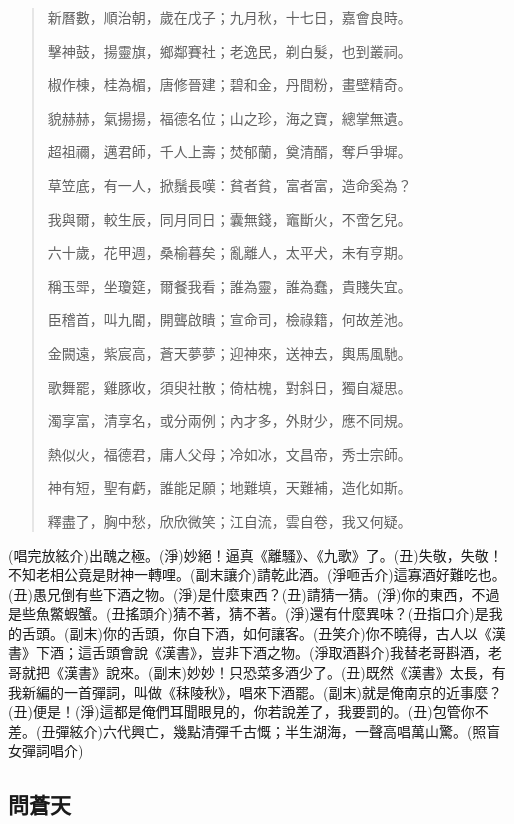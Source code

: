 \documentclass[UTF8]{ctexart}
\begin{document}
\begin{verse}

    新曆數，順治朝，歲在戊子；九月秋，十七日，嘉會良時。
    
    擊神鼓，揚靈旗，鄉鄰賽社；老逸民，剃白髮，也到叢祠。
    
    椒作棟，桂為楣，唐修晉建；碧和金，丹間粉，畫壁精奇。
    
    貌赫赫，氣揚揚，福德名位；山之珍，海之寶，總掌無遺。
    
    超祖禰，邁君師，千人上壽；焚郁蘭，奠清醑，奪戶爭墀。
    
    草笠底，有一人，掀鬚長嘆：貧者貧，富者富，造命奚為？
    
    我與爾，較生辰，同月同日；囊無錢，竈斷火，不啻乞兒。
    
    六十歲，花甲週，桑榆暮矣；亂離人，太平犬，未有亨期。
    
    稱玉斝，坐瓊筵，爾餐我看；誰為靈，誰為蠢，貴賤失宜。
    
    臣稽首，叫九閽，開聾啟瞶；宣命司，檢祿籍，何故差池。
    
    金闕遠，紫宸高，蒼天夢夢；迎神來，送神去，輿馬風馳。
    
    歌舞罷，雞豚收，須臾社散；倚枯槐，對斜日，獨自凝思。
    
    濁享富，清享名，或分兩例；內才多，外財少，應不同規。
    
    熱似火，福德君，庸人父母；冷如冰，文昌帝，秀士宗師。
    
    神有短，聖有虧，誰能足願；地難填，天難補，造化如斯。
    
    釋盡了，胸中愁，欣欣微笑；江自流，雲自卷，我又何疑。

\end{verse}

(唱完放絃介)出醜之極。(淨)妙絕！逼真《離騷》、《九歌》了。(丑)失敬，失敬！不知老相公竟是財神一轉哩。(副末讓介)請乾此酒。(淨咂舌介)這寡酒好難吃也。(丑)愚兄倒有些下酒之物。(淨)是什麼東西？(丑)請猜一猜。(淨)你的東西，不過是些魚鱉蝦蟹。(丑搖頭介)猜不著，猜不著。(淨)還有什麼異味？(丑指口介)是我的舌頭。(副末)你的舌頭，你自下酒，如何讓客。(丑笑介)你不曉得，古人以《漢書》下酒；這舌頭會說《漢書》，豈非下酒之物。(淨取酒斟介)我替老哥斟酒，老哥就把《漢書》說來。(副末)妙妙！只恐菜多酒少了。(丑)既然《漢書》太長，有我新編的一首彈詞，叫做《秣陵秋》，唱來下酒罷。(副末)就是俺南京的近事麼？(丑)便是！(淨)這都是俺們耳聞眼見的，你若說差了，我要罰的。(丑)包管你不差。(丑彈絃介)六代興亡，幾點清彈千古慨；半生湖海，一聲高唱萬山驚。(照盲女彈詞唱介)

\subsection{問蒼天}
\end{document}
